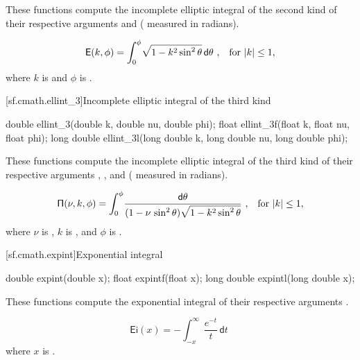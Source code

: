 \begin{itemdescr}
\pnum
\effects
These functions compute
the incomplete elliptic integral of the second kind
of their respective arguments
 and  ( measured in radians).

\pnum
\returns
\[ \mathsf{E}(k, \phi) = \int_0^\phi \! \sqrt{1 - k^2 \sin^2 \theta} \, \mathsf{d}\theta
   \text{ ,\quad for $|k| \le 1$,} \]
where
$k$ is  and
$\phi$ is .
\end{itemdescr}

[sf.cmath.ellint_3]{Incomplete elliptic integral of the third kind}%
%
%
%
%
%
\begin{itemdecl}
double       ellint_3(double k, double nu, double phi);
float        ellint_3f(float k, float nu, float phi);
long double  ellint_3l(long double k, long double nu, long double phi);
\end{itemdecl}

\begin{itemdescr}

\pnum\effects
These functions compute
the incomplete elliptic integral of the third kind
of their respective arguments
, , and  ( measured in radians).

\pnum
\returns
\[ \mathsf{\Pi}(\nu, k, \phi) = \int_0^\phi \!
   \frac{ \mathsf{d}\theta }{ (1 - \nu \, \sin^2 \theta) \sqrt{1 - k^2 \sin^2 \theta} } \text{ ,\quad for $|k| \le 1$,} \]
where
$\nu$ is ,
$k$ is , and
$\phi$ is .
\end{itemdescr}

[sf.cmath.expint]{Exponential integral}%
%
%
%
%
%
\begin{itemdecl}
double       expint(double x);
float        expintf(float x);
long double  expintl(long double x);
\end{itemdecl}

\begin{itemdescr}

\pnum\effects
These functions compute the exponential integral
of their respective arguments
.

\pnum\returns
\[%
  \mathsf{Ei}(x) =
  - \int_{-x}^\infty \frac{e^{-t}}
                          {t     } \, \mathsf{d}t
\;
\]
where
$x$ is .

\end{itemdescr}

